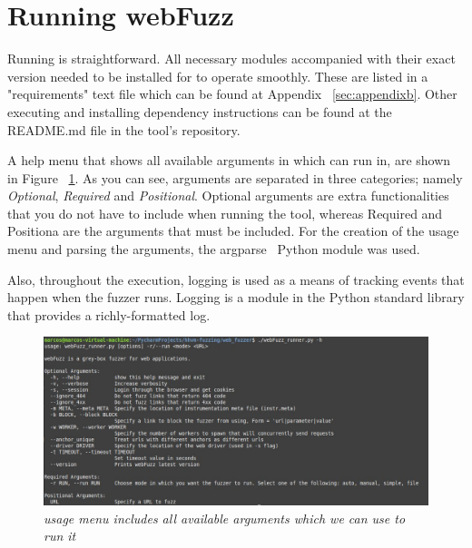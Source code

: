 \section{Running webFuzz}
Running \pname{} is straightforward. All necessary modules accompanied with their exact version needed to be installed for \pname{} to operate smoothly. These are listed in a "requirements" text file which can be found at Appendix ~\ref{sec:appendixb}. Other executing and installing dependency instructions can be found at the README.md file in the tool's repository.

A help menu that shows all available arguments in which \pname{} can run in, are shown in Figure ~\ref{fig:argparser_menu}. As you can see, arguments are separated in three categories; namely \emph{Optional}, \emph{Required} and \emph{Positional}. Optional arguments are extra functionalities that you do not have to include when running the tool, whereas Required and Positiona are the arguments that must be included. For the creation of the usage menu and parsing the arguments, the argparse~\cite{argparse} Python module was used.

Also, throughout the execution, logging is used as a means of tracking events that happen when the fuzzer runs. Logging is a module in the Python standard library that provides a richly-formatted log.

\begin{figure}[ht]
 \centering
 \captionsetup{justification=centering}
 \includegraphics[width=\linewidth]{figures/argparser_menu.jpg}
 \caption[\pname{} usage menu]{\textit{\pname{} usage menu includes all available arguments which we can use to run it}}
 \label{fig:argparser_menu}
\end{figure}
